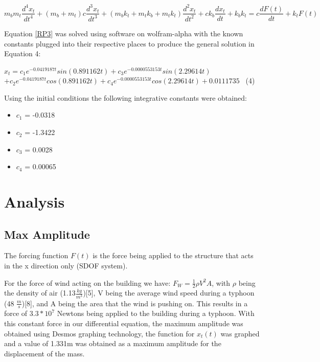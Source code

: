 \documentclass[12pt,twoside,letterpaper]{article}
\begin{document}
\begin{equation}
m_b m_t \frac{d^4x_t}{dt^4} + (m_b+m_t)c\frac{d^3x_t}{dt^3} + (m_b k_t+m_t k_b+m_t k_t)\frac{d^2x_t}{dt^2} + ck_b\frac{dx_t}{dt}+k_bk_t = c\frac{dF(t)}{dt}+k_tF(t)
\label{RP3}
\end{equation}

Equation \ref{RP3} was solved using software on wolfram-alpha with the known constants plugged into their respective places to produce the general solution in Equation 4:
\newline
\begin{center}
$x_t = c_1 e^{-0.0419187t} sin(0.891162 t) + c_3 e^{-0.0000553153 t} sin(2.29614 t)$ \newline $+ c_2 e^{-0.0419187 t} cos(0.891162 t) + c_4 e^{-0.0000553153 t} cos(2.29614 t) + 0.0111735$ \qquad \qquad \ (4)
\end{center}

Using the initial conditions the following integrative constants were obtained:
\begin{itemize}
\item $c_1$ = -0.0318
\item $c_2$ = -1.3422
\item $c_3$ = 0.0028
\item $c_4$ = 0.00065
\end{itemize}

\section*{Analysis}
\subsection*{Max Amplitude}
The forcing function $F(t)$ is the force being applied to the structure that acts in the x direction only (SDOF system).

For the force of wind acting on the building we have: $F_W = \frac{1}{2} \rho V^2 A$, with $\rho$ being the density of air (1.13$\frac{kg}{m^3}$)[5], V being the average wind speed during a typhoon (48 $\frac{m}{s}$)[8], and A being the area that the wind is pushing on. This results in a force of $3.3*10^7$ Newtons being applied to the building during a typhoon. With this constant force in our differential equation, the maximum amplitude was obtained using Desmos graphing technology, the function for $x_t(t)$ was graphed and a value of 1.331m was obtained as a maximum amplitude for the displacement of the mass.
\end{document}
